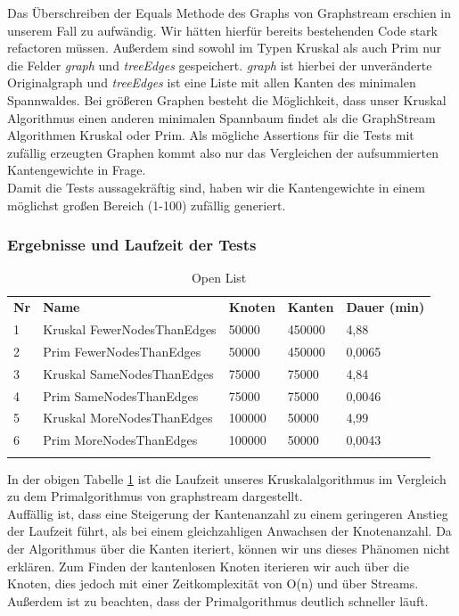 \documentclass[a4paper]{article}
\begin{document}
Das Überschreiben der Equals Methode des Graphs von Graphstream erschien in unserem Fall zu aufwändig. Wir hätten hierfür bereits bestehenden Code stark refactoren müssen. Außerdem sind sowohl im Typen Kruskal als auch Prim nur die Felder \textit{graph} und \textit{treeEdges} gespeichert. \textit{graph} ist hierbei der unveränderte Originalgraph und \textit{treeEdges} ist eine Liste mit allen Kanten des minimalen Spannwaldes. Bei größeren Graphen besteht die Möglichkeit, dass unser Kruskal Algorithmus einen anderen minimalen Spannbaum findet als die GraphStream Algorithmen Kruskal oder Prim. Als mögliche Assertions für die Tests mit zufällig erzeugten Graphen kommt also nur das Vergleichen der aufsummierten Kantengewichte in Frage.\\
Damit die Tests aussagekräftig sind, haben wir die Kantengewichte in einem möglichst großen Bereich (1-100) zufällig generiert.

\subsubsection{Ergebnisse und Laufzeit der Tests}

\begin{table}[htbp]
    \centering
    \begin{tabular}{||l|l|l|l|l||}
    \hhline{|t:=====:t|}
    \textbf{Nr} & \textbf{Name} & \textbf{Knoten} & \textbf{Kanten} & \textbf{Dauer (min)} \\ \hhline{|-----|}
         1 & Kruskal FewerNodesThanEdges & 50000 & 450000 & 4,88 \\ \hhline{|-----|}
         2 & Prim FewerNodesThanEdges & 50000 & 450000 & 0,0065 \\ \hhline{|-----|}
         3 & Kruskal SameNodesThanEdges & 75000 & 75000 & 4,84 \\ \hhline{|-----|}
         4 & Prim SameNodesThanEdges & 75000 & 75000 & 0,0046 \\ \hhline{|-----|}
         5 & Kruskal MoreNodesThanEdges & 100000 & 50000 & 4,99 \\ \hhline{|-----|}
         6 & Prim MoreNodesThanEdges & 100000 & 50000 & 0,0043 \\ \hhline{|b:=====:b|}
    \end{tabular}
    \caption{Open List}
    \label{laufzeit}
\end{table}

In der obigen Tabelle \ref{laufzeit} ist die Laufzeit unseres Kruskalalgorithmus im Vergleich zu dem Primalgorithmus von graphstream dargestellt.\\
Auffällig ist, dass eine Steigerung der Kantenanzahl zu einem geringeren Anstieg der Laufzeit führt, als bei einem gleichzahligen Anwachsen der Knotenanzahl. 
Da der Algorithmus über die Kanten iteriert, können wir uns dieses Phänomen nicht erklären. Zum Finden der kantenlosen Knoten iterieren wir auch über die Knoten, dies jedoch mit einer Zeitkomplexität von O(n) und über Streams.\\
Außerdem ist zu beachten, dass der Primalgorithmus deutlich schneller läuft.



\end{document}
